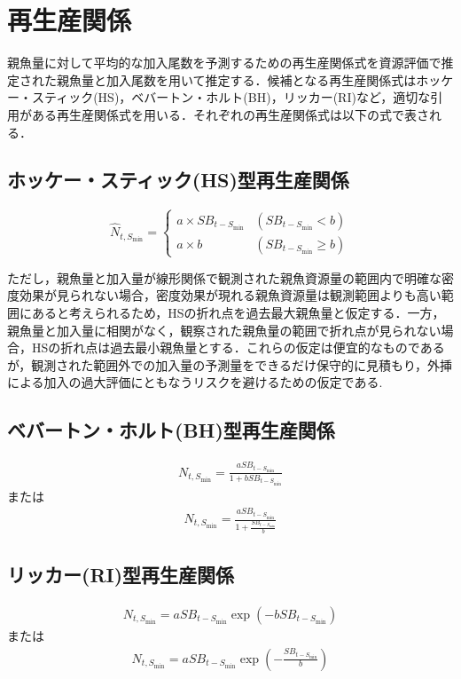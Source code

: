 \documentclass[11pt]{jsarticle}
\begin{document}
\section{再生産関係}
親魚量に対して平均的な加入尾数を予測するための再生産関係式を資源評価で推定された親魚量と加入尾数を用いて推定する．候補となる再生産関係式はホッケー・スティック(HS)\cite{hockey}，ベバートン・ホルト(BH)\cite{beverton}，リッカー(RI)\cite{ricker}など，適切な引用がある再生産関係式を用いる．それぞれの再生産関係式は以下の式で表される．

\subsection{ホッケー・スティック(HS)型再生産関係}


\begin{equation}
  \hat{N}_{t,S_{\mathrm{min}}} = \begin{cases}
    a \times SB_{t-S_{\mathrm{min}}} & (SB_{t-S_{\mathrm{min}}} < b) \\
    a \times b                 & (SB_{t-S_{\mathrm{min}}} \geq b)
  \end{cases}
  \label{HS}
\end{equation}

ただし，親魚量と加入量が線形関係で観測された親魚資源量の範囲内で明確な密度効果が見られない場合，密度効果が現れる親魚資源量は観測範囲よりも高い範囲にあると考えられるため，HSの折れ点を過去最大親魚量と仮定する．一方，親魚量と加入量に相関がなく，観察された親魚量の範囲で折れ点が見られない場合，HSの折れ点は過去最小親魚量とする．これらの仮定は便宜的なものであるが，観測された範囲外での加入量の予測量をできるだけ保守的に見積もり，外挿による加入の過大評価にともなうリスクを避けるための仮定である.

\subsection{ベバートン・ホルト(BH)型再生産関係}

\begin{eqnarray}
  N_{t,S_{\mathrm{min}}}=\frac{a SB_{t-S_{\mathrm{min}}}}{1 + b SB_{t-S_{\mathrm{min}}}}
  \label{BH1}
\end{eqnarray}
または
\begin{eqnarray}
  N_{t,S_{\mathrm{min}}}=\frac{a SB_{t-S_{\mathrm{min}}}}{1 + \frac{SB_{t-S_{\mathrm{min}}}}{b}}
  \label{BH2}
\end{eqnarray}

\subsection{リッカー(RI)型再生産関係}
\begin{eqnarray}
  N_{t,S_{\mathrm{min}}}= a SB_{t-S_{\mathrm{min}}}   \exp{(-b SB_{t-S_{\mathrm{min}}})}
  \label{RI1}  
\end{eqnarray}
または
\begin{eqnarray}
  N_{t,S_{\mathrm{min}}}= a SB_{t-S_{\mathrm{min}}}   \exp{(-\frac{SB_{t-S_{\mathrm{min}}}}{b})}
  \label{RI2}    
\end{eqnarray}
\end{document}

